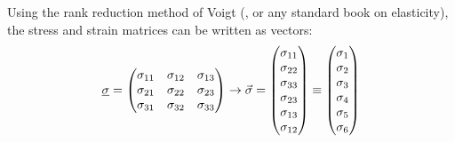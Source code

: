 Using the rank reduction method of Voigt (\cite{voigt1928lehrbuch}, or any standard book on elasticity), the stress and strain matrices can be written as vectors:
\begin{equation}
	\uline{\sigma} = 
	\begin{pmatrix}
	\sigma_{11} & \sigma_{12} & \sigma_{13} \\
	\sigma_{21} & \sigma_{22} & \sigma_{23} \\
	\sigma_{31} & \sigma_{32} & \sigma_{33} \\ 
	\end{pmatrix}
	\to 
	\vec{\sigma} = 
	\begin{pmatrix}
	\sigma_{11} \\ \sigma_{22} \\ \sigma_{33} \\ \sigma_{23} \\ \sigma_{13} \\ \sigma_{12}
	\end{pmatrix}
	\equiv
	\begin{pmatrix}
	\sigma_{1} \\ \sigma_{2} \\ \sigma_{3} \\ \sigma_{4} \\ \sigma_{5} \\ \sigma_{6}
	\end{pmatrix}
	\label{eq:sigma_def}
\end{equation}

